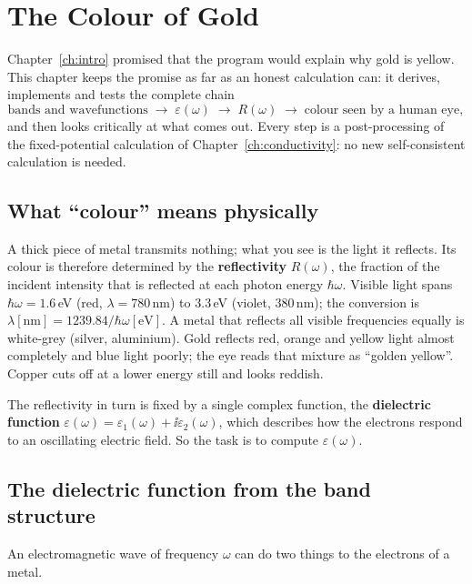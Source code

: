 \chapter{The Colour of Gold}
\label{ch:colour}

Chapter~\ref{ch:intro} promised that the program would explain why gold is
yellow. This chapter keeps the promise as far as an honest calculation
can: it derives, implements and tests the complete chain
\[
\text{bands and wavefunctions}
\;\to\; \varepsilon(\omega)
\;\to\; R(\omega)
\;\to\; \text{colour seen by a human eye},
\]
and then looks critically at what comes out. Every step is a
post-processing of the fixed-potential calculation of
Chapter~\ref{ch:conductivity}: no new self-consistent calculation is
needed.

\section{What ``colour'' means physically}

A thick piece of metal transmits nothing; what you see is the light it
reflects. Its colour is therefore determined by the
\textbf{reflectivity} $R(\omega)$, the fraction of the incident intensity
that is reflected at each photon energy $\hbar\omega$. Visible light spans
$\hbar\omega = 1.6$\,eV (red, $\lambda = 780$\,nm) to $3.3$\,eV (violet,
$380$\,nm); the conversion is $\lambda[\mathrm{nm}] =
1239.84/\hbar\omega[\mathrm{eV}]$. A metal that reflects all visible
frequencies equally is white-grey (silver, aluminium). Gold reflects red,
orange and yellow light almost completely and blue light poorly; the eye
reads that mixture as ``golden yellow''. Copper cuts off at a lower
energy still and looks reddish.

The reflectivity in turn is fixed by a single complex function, the
\textbf{dielectric function} $\varepsilon(\omega) = \varepsilon_1(\omega)
+ \ii\varepsilon_2(\omega)$, which describes how the electrons respond to
an oscillating electric field. So the task is to compute
$\varepsilon(\omega)$.

\section{The dielectric function from the band structure}

An electromagnetic wave of frequency $\omega$ can do two things to the
electrons of a metal.

